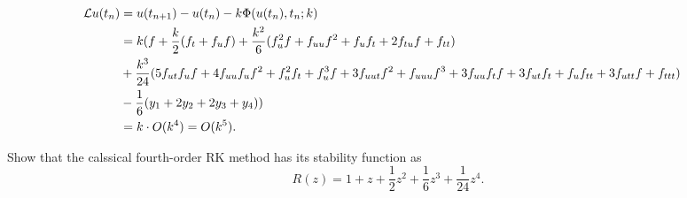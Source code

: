 \documentclass[lang=cn,a4paper,newtx,bibend=bibtex]{elegantpaper}
\begin{document}
\begin{solution}
\begin{equation*}
  \end{equation*}
  \begin{equation*}
    \begin{aligned}
      \mathcal{L} u(t_n) & = u(t_{n+1}) - u(t_n) - k\Phi(u(t_n), t_n; k) & \\
      & = k(f + \frac k2(f_t + f_uf) + 
      \frac{k^2}6(f_u^2f + f_{uu}f^2 + f_uf_t + 2f_{tu}f + f_{tt}) & \\
      & + \frac{k^3}{24}(5f_{ut}f_uf + 4f_{uu}f_uf^2 + f_u^2f_t + f_u^3f + 3f_{uut}f^2 + f_{uuu}f^3 + 3f_{uu}f_tf + 3f_{ut}f_t + f_uf_{tt} + 3f_{utt}f + f_{ttt}) & \\
      & - \frac 16(y_1 + 2y_2 + 2y_3 + y_4)) & \\
      & = k \cdot O(k^4) = O(k^5). & \\
    \end{aligned}
  \end{equation*}
\end{solution}

\begin{prob}[Exercise 10.202]
  Show that the calssical fourth-order RK method has its stability function as
  \begin{equation*}
    R(z) = 1 + z + \frac 12 z^2 + \frac 16 z^3 + \frac 1{24}z^4.
  \end{equation*}
\end{prob}
\end{document}
